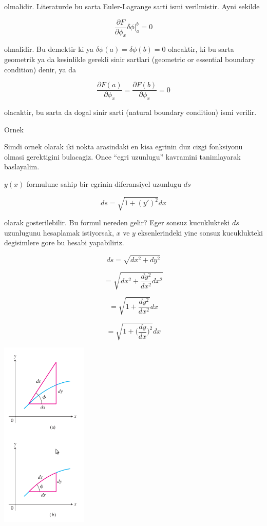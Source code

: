 \documentclass[12pt,fleqn]{article}\usepackage{../common}
\begin{document}
olmalidir. Literaturde bu sarta Euler-Lagrange sarti ismi verilmistir. Ayni
sekilde 

\[ \frac{\partial F}{\partial \phi_x} \delta \phi \bigg|_a^b = 0 \]

olmalidir. Bu demektir ki ya $\delta \phi(a) = \delta \phi(b) = 0$ olacaktir, ki
bu sarta geometrik ya da kesinlikle gerekli sinir sartlari (geometric or
essential boundary condition) denir, ya da

\[ \frac{\partial F(a)}{\partial \phi_x} = \frac{\partial F(b)}{\partial \phi_x} = 0 \]

olacaktir, bu sarta da dogal sinir sarti (natural boundary condition) ismi
verilir. 

Ornek

Simdi ornek olarak iki nokta arasindaki en kisa egrinin duz cizgi fonksiyonu
olmasi gerektigini bulacagiz. Once ``egri uzunlugu'' kavramini tanimlayarak
baslayalim. 

$y(x)$ formulune sahip bir egrinin diferansiyel uzunlugu $ds$

\[ ds = \sqrt{1 + (y')^2} dx \]

olarak gosterilebilir. Bu formul nereden gelir? Eger sonsuz kucuklukteki $ds$
uzunlugunu hesaplamak istiyorsak, $x$ ve $y$ eksenlerindeki yine sonsuz
kucuklukteki degisimlere gore bu hesabi yapabiliriz. 

\[ ds = \sqrt{dx^2 + dy^2}  \]

\[ = \sqrt{dx^2 + \frac{dy^2}{dx^2}dx^2} \]

\[ = \sqrt{1 + \frac{dy^2}{dx^2}}dx  \]

\[ = \sqrt{1 + \bigg( \frac{dy}{dx} \bigg)^2 }dx  \]

\includegraphics[height=9cm]{curve-length.png}
\end{document}
